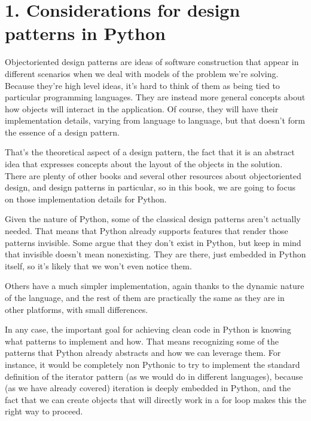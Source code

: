 \documentclass[a4paper,10pt,english]{sphinxmanual}
\begin{document}
\section{1. Considerations for design patterns in Python}
\label{\detokenize{chapters/9_design_patterns/index:considerations-for-design-patterns-in-python}}
Object\sphinxhyphen{}oriented design patterns are ideas of software construction that appear in different
scenarios when we deal with models of the problem we’re solving. Because they’re high\sphinxhyphen{}
level ideas, it’s hard to think of them as being tied to particular programming languages.
They are instead more general concepts about how objects will interact in the application.
Of course, they will have their implementation details, varying from language to language,
but that doesn’t form the essence of a design pattern.

That’s the theoretical aspect of a design pattern, the fact that it is an abstract idea that
expresses concepts about the layout of the objects in the solution. There are plenty of other
books and several other resources about object\sphinxhyphen{}oriented design, and design patterns in
particular, so in this book, we are going to focus on those implementation details for
Python.

Given the nature of Python, some of the classical design patterns aren’t actually needed.
That means that Python already supports features that render those patterns invisible.
Some argue that they don’t exist in Python, but keep in mind that invisible doesn’t mean
non\sphinxhyphen{}existing. They are there, just embedded in Python itself, so it’s likely that we won’t
even notice them.

Others have a much simpler implementation, again thanks to the dynamic nature of the
language, and the rest of them are practically the same as they are in other platforms, with
small differences.

In any case, the important goal for achieving clean code in Python is knowing what
patterns to implement and how. That means recognizing some of the patterns that Python
already abstracts and how we can leverage them. For instance, it would be completely non\sphinxhyphen{}
Pythonic to try to implement the standard definition of the iterator pattern (as we would do
in different languages), because (as we have already covered) iteration is deeply embedded
in Python, and the fact that we can create objects that will directly work in a for loop
makes this the right way to proceed.
\end{document}
